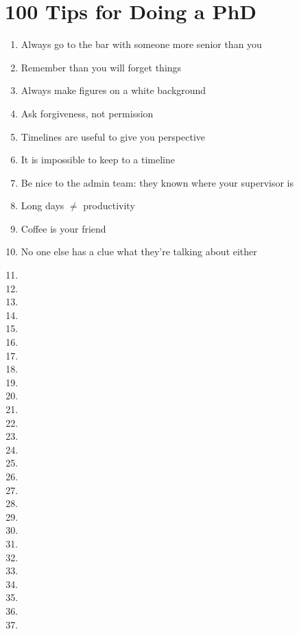%
%

\chapter{100 Tips for Doing a PhD}
\label{app:app01}

\begin{enumerate}
	\item Always go to the bar with someone more senior than you
	\item Remember than you will forget things
	\item Always make figures on a white background
	\item Ask forgiveness, not permission
	\item Timelines are useful to give you perspective
	\item It is impossible to keep to a timeline
	\item Be nice to the admin team: they known where your supervisor is
	\item Long days $\ne$ productivity
	\item Coffee is your friend
	\item No one else has a clue what they're talking about either
	\item
	\item
	\item
	\item
	\item
	\item
	\item
	\item
	\item
	\item
	\item
	\item
	\item
	\item
	\item
	\item
	\item
	\item
	\item
	\item
	\item
	\item
	\item
	\item
	\item
	\item
	\item

\end{enumerate}
